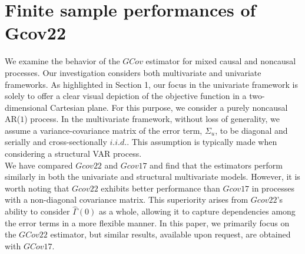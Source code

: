 \documentclass[<1p>]{elsarticle} %
\begin{document}
\section{\textbf{Finite sample performances of Gcov22}}
We examine the behavior of the $GCov$ estimator for mixed causal and noncausal processes. Our investigation considers both multivariate and univariate frameworks.  As highlighted in Section 1, our focus in the univariate framework is solely to offer a clear visual depiction of the objective function in a two-dimensional Cartesian plane. For this purpose, we consider a purely noncausal AR($1$) process. In the multivariate framework, without loss of generality, we assume a variance-covariance matrix of the error term, $\Sigma_u$, to be diagonal and serially and cross-sectionally $i.i.d.$. This assumption is typically made when considering a structural VAR process.\\
\indent We have compared $Gcov22$ and $Gcov17$ and find that the estimators perform similarly in both the univariate and structural multivariate models. However, it is worth noting that $Gcov22$ exhibits better performance than $Gcov17$ in processes with a  non-diagonal covariance matrix. This superiority arises from $Gcov22$'s ability to consider $\hat{\Gamma}(0)$ as a whole, allowing it to capture dependencies among the error terms in a more flexible manner. In this paper, we primarily focus on the $GCov22$ estimator, but similar results, available upon request, are obtained with $GCov17$.
\end{document}
